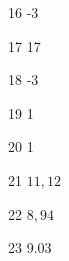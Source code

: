 \begin{loigiaibt}{16}
 -3
\end{loigiaibt}
\begin{loigiaibt}{17}
 17
\end{loigiaibt}
\begin{loigiaibt}{18}
 -3
\end{loigiaibt}
\begin{loigiaibt}{19}
 1
\end{loigiaibt}
\begin{loigiaibt}{20}
 1
\end{loigiaibt}
\begin{loigiaibt}{21}
 $11,12$
\end{loigiaibt}
\begin{loigiaibt}{22}
 $8,94$
\end{loigiaibt}
\begin{loigiaibt}{23}
 9.03
\end{loigiaibt}
